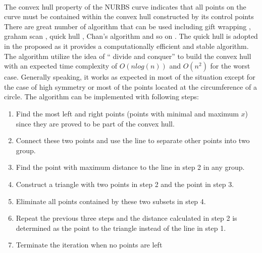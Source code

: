 \paragraph{}
The convex hull property of the NURBS curve indicates that all points on the curve must be contained within the convex hull constructed by its control points \citep{SELIMOVIC2009772}
There are great number of algorithm that can be used including gift wrapping \citep{Cormen:2009:IAT:1614191}, graham scan \citep{ANDERSON197853}, quick hull \citep{Barber:1996:QAC:235815.235821}, Chan's algorithm \citep{Chan1996} and so on \citep{doi:10.1137/0215021, ANDREW1979216}.
The quick hull is adopted in the proposed as it provides a computationally efficient and stable algorithm.
The algorithm utilize the idea of `` divide and conquer'' to build the convex hull with an expected time complexity of $O(nlog(n))$ and  $O(n^2)$ for the worst case.
Generally speaking, it works as expected in most of the situation except for the case of high symmetry or most of the points located at the circumference of a circle.
The algorithm can be implemented with following steps:
\begin{enumerate}
    \item Find the most left and right points (points with minimal and maximum $x$) since they are proved to be part of the convex hull.
    \item Connect these two points and use the line to separate other points into two group.
    \item Find the point with maximum distance to the line in step 2 in any group.
    \item Construct a triangle with two points in step 2 and the point in step 3.
    \item Eliminate all points contained by these two subsets in step 4.
    \item Repeat the previous three steps and the distance calculated in step 2 is determined as the point to the triangle instead of the line in step 1.
    \item Terminate the iteration when no points are left
\end{enumerate}